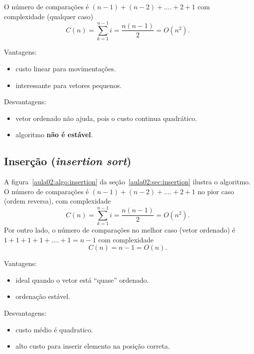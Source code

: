 
O número de comparações é $(n-1)+(n-2)+....+2+1$ com complexidade (qualquer caso)
\begin{equation*}
C(n) = \sum_{k=1}^{n-1} i = \frac{n(n-1)}{2} = O(n^2).
\end{equation*}

Vantagens:
\begin{itemize}
\item custo linear para movimentações.
\item interessante para vetores pequenos.
\end{itemize}
Desvantagens:
\begin{itemize}
\item vetor ordenado não ajuda, pois o custo continua quadrático.
\item algoritmo {\bf não é estável}.
\end{itemize}

\subsection{Inserção (\emph{insertion sort})}

A figura~\ref{aula02:algo:insertion} da seção~\ref{aula02:sec:insertion} ilustra
o algoritmo.
%
O número de comparações é $(n-1)+(n-2)+....+2+1$ no pior caso (ordem reversa), com complexidade
\begin{equation*}
C(n) = \sum_{k=1}^{n-1} i = \frac{n(n-1)}{2} = O(n^2).
\end{equation*}
Por outro lado, o número de comparações no melhor caso (vetor ordenado) é 
$1 + 1 + 1 + 1+ .... + 1 = n-1$ com complexidade
\begin{equation*}
C(n) = n - 1  = O(n).
\end{equation*}


Vantagens:
\begin{itemize}
\item ideal quando o vetor está ``quase'' ordenado.
\item ordenação estável.
\end{itemize}
Desvantagens:
\begin{itemize}
\item custo médio é quadratico.
\item alto custo para inserir elemento na posição correta.
\end{itemize}

